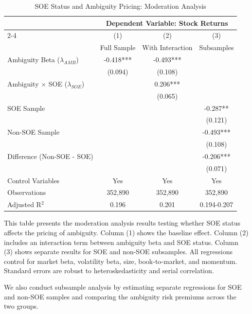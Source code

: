 \documentclass[preprint,12pt,authoryear]{elsarticle}
\begin{document}
\begin{table}[htbp]
\centering
\caption{SOE Status and Ambiguity Pricing: Moderation Analysis}
\label{tab:soe_moderation}
\begin{threeparttable}
\begin{tabular*}{\textwidth}{@{\extracolsep{\fill}} lccc @{\extracolsep{\fill}}}
\toprule
& \multicolumn{3}{c}{Dependent Variable: Stock Returns} \\
\cmidrule(lr){2-4}
& (1) & (2) & (3) \\
& Full Sample & With Interaction & Subsamples \\
\midrule
\midrule
Ambiguity Beta ($\lambda_{AMB}$) & -0.418*** & -0.493*** &  \\
& (0.094) & (0.108) &  \\
\midrule
Ambiguity $\times$ SOE ($\lambda_{SOE}$) & & 0.206*** &  \\
& & (0.065) &  \\
\midrule
SOE Sample & & & -0.287** \\
& & & (0.121) \\
\midrule
Non-SOE Sample & & & -0.493*** \\
& & & (0.108) \\
\midrule
Difference (Non-SOE - SOE) & & & -0.206*** \\
& & & (0.071) \\
\midrule
Control Variables & Yes & Yes & Yes \\
\midrule
Observations & 352,890 & 352,890 & 352,890 \\
Adjusted R$^2$ & 0.196 & 0.201 & 0.194-0.207 \\
\bottomrule
\end{tabular*}
\begin{tablenotes}[flushleft]
\small
\item[] This table presents the moderation analysis results testing whether SOE status affects the pricing of ambiguity. Column (1) shows the baseline effect. Column (2) includes an interaction term between ambiguity beta and SOE status. Column (3) shows separate results for SOE and non-SOE subsamples. All regressions control for market beta, volatility beta, size, book-to-market, and momentum. Standard errors are robust to heteroskedasticity and serial correlation.
\end{tablenotes}
\end{threeparttable}
\end{table}

We also conduct subsample analysis by estimating separate regressions for SOE and non-SOE samples and comparing the ambiguity risk premiums across the two groups.
 
\end{document}

